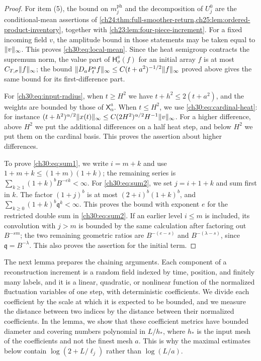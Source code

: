 \begin{proof}
For item (5), the bound on $m_j^{\mathrm{ph}}$ and the decomposition of $U_j^0$ are the conditional-mean assertions of \cref{ch24:thm:full-smoother-return,ch25:lem:ordered-product-inventory}, together with \cref{ch23:lem:four-piece-increment}. For a fixed incoming field $v$, the amplitude bound in those statements may be taken equal to $\lVert v\rVert_\infty$. This proves \eqref{ch30:eq:local-mean}. Since the heat semigroup contracts the supremum norm, the value part of $\mathsf H_\sigma^a(f)$ for an initial array $f$ is at most $C_{T,\sigma}\lVert f\rVert_\infty$; the bound $\lVert D_aP_t^af\rVert_\infty\le C(t+a^2)^{-1/2}\lVert f\rVert_\infty$ proved above gives the same bound for its first-difference part.

For \eqref{ch30:eq:input-radius}, when $t\ge H^2$ we have $t+h^2\le2(t+a^2)$, and the weights are bounded by those of $\mathsf X_\alpha^a$. When $t\le H^2$, we use \eqref{ch30:eq:cardinal-heat}: for instance $(t+h^2)^{\alpha/2}\lVert x(t)\rVert_\infty\le C(2H^2)^{\alpha/2}H^{-1}\lVert v\rVert_\infty$. For a higher difference, above $H^2$ we put the additional differences on a half heat step, and below $H^2$ we put them on the cardinal basis. This proves the assertion about higher differences.

To prove \eqref{ch30:eq:sum1}, we write $i=m+k$ and use $1+m+k\le(1+m)(1+k)$; the remaining series is $\sum_{k\ge1}(1+k)^bB^{-ek}<\infty$. For \eqref{ch30:eq:sum2}, we set $j=i+1+k$ and sum first in $k$. The factor $(1+j)^b$ is at most $(2+i)^b(1+k)^b$, and $\sum_{k\ge0}(1+k)^b\mathfrak q^k<\infty$. This proves the bound with exponent $e$ for the restricted double sum in \eqref{ch30:eq:sum2}. If an earlier level $i\le m$ is included, its convolution with $j>m$ is bounded by the same calculation after factoring out $B^{-sm}$; the two remaining geometric ratios are $B^{-(e-s)}$ and $B^{-(\lambda-s)}$, since $\mathfrak q=B^{-\lambda}$. This also proves the assertion for the initial term.
\end{proof}

The next lemma prepares the chaining arguments. Each component of a reconstruction increment is a random field indexed by time, position, and finitely many labels, and it is a linear, quadratic, or nonlinear function of the normalized fluctuation variables of one step, with deterministic coefficients. We divide each coefficient by the scale at which it is expected to be bounded, and we measure the distance between two indices by the distance between their normalized coefficients. In the lemma, we show that these coefficient metrics have bounded diameter and covering numbers polynomial in $L/h_*$, where $h_*$ is the input mesh of the coefficients and not the finest mesh $a$. This is why the maximal estimates below contain $\log(2+L/\ell_j)$ rather than $\log(L/a)$.

